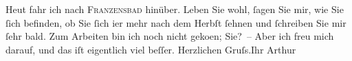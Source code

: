 \begin{ledgroupsized}[t]{13cm}
           \pstart
           Heut fahr ich nach \textsc{Franzensbad} hinüber.\pend
           \pstart
           Leben Sie wohl, ſagen Sie mir, wie Sie ſich befinden, ob Sie ſich i{\geminationm}er mehr nach dem Herbſt ſehnen und ſchreiben Sie
                    mir ſehr bald. Zum Arbeiten bin ich noch {\pb}nicht
                        geko{\geminationm}en; Sie? – Aber ich freu mich darauf, und
                    das iſt eigentlich viel beſſer.\pend
           \pstart Herzlichen Gruſs.\hspace*{2em}Ihr
                        \spacefill\mbox{Arthur}\pend{}\endnumbering{}\end{ledgroupsized}  \newcommand{\dateiname}{L00462}\newcommand{\titel}{Arthur Schnitzler an Hugo von Hofmannsthal, 10. 7. 1895}\newcommand{\editorInnen}{Martin Anton Müller und Gerd-Hermann Susen}
      